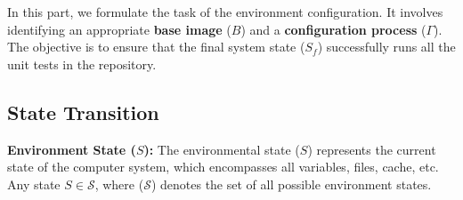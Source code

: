 \vspace{-0.5em}

In this part, we formulate the task of the environment configuration.
It involves identifying an appropriate \textbf{base image} ($B$) and a \textbf{configuration process} ($\Gamma$). The objective is to ensure that the final system state ($S_f$) successfully runs all the unit tests in the repository.
\vspace{-0.5em}

\subsection{State Transition}
\vspace{-0.5em}

\textbf{Environment State ($S$):}
The environmental state ($S$) represents the current state of the computer system, which encompasses all variables, files, cache, etc. Any state $S \in \mathcal{S}$, where ($\mathcal{S}$) denotes the set of all possible environment states.

